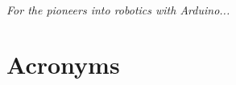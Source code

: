 \documentclass[oneside,openany]{tufte-book} %
\begin{document}
\newpage
~\vfill
\begin{fullwidth}
	\noindent\fontsize{18}{22}\selectfont\itshape \nohyphenation    
	\centering
	For the pioneers into robotics with Arduino...
	\vfill \vfill
\end{fullwidth}

\begin{spacing}{0.80}
    \tableofcontents %
\end{spacing}

\let\cleardoublepage\clearpage 

\listoffigures
\listoftables

\chapter*{Acronyms}
	\printacronyms[heading=none]


\mainmatter








\end{document}
